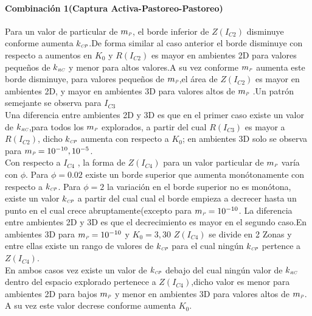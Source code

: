 \paragraph*{Combinaci\'on 1(Captura Activa-Pastoreo-Pastoreo)}Para un valor de particular de $m_{\textit{\tiny P}}$, el borde inferior de $Z(I_{C2})$ disminuye conforme aumenta $k_{\textit{\tiny CP}}$.De forma similar al caso anterior el borde disminuye con respecto a aumentos en $K_0$ y $R(I_{C2})$ es mayor en ambientes 2D para valores peque\~nos de $k_{\textit{\tiny RC}}$ y menor para altos valores.A su vez conforme $m_{\textit{\tiny P}}$ aumenta este borde disminuye, para valores peque\~nos de $m_{\textit{\tiny P}}$,el \'area de $Z(I_{C2})$ es mayor en ambientes 2D, y mayor en ambientes 3D para valores altos de $m_{\textit{\tiny P}}$ .Un patr\'on semejante se observa para $I_{C3}$ \\ Una diferencia entre ambientes 2D y 3D es que en el primer caso existe un valor de $k_{\textit{\tiny RC}}$,para todos los $m_{\textit{\tiny P}}$ explorados, a partir del cual $R(I_{C3})$ es mayor a $R(I_{C2})$, dicho $k_{\textit{\tiny CP}}$ aumenta con respecto a $K_0$; en ambientes 3D solo se observa para $m_{\textit{\tiny P}} = 10^{-10} ,10^{-5}$.\\
Con respecto a $I_{C4}$ , la forma de $Z(I_{C4})$ para un valor particular de $m_{\textit{\tiny P}}$ var\'ia con $\phi$. Para $\phi = 0.02$  existe un borde superior que aumenta mon\'otonamente con respecto a $k_{\textit{\tiny CP}}$. Para $\phi = 2$ la variaci\'on en el borde superior no es mon\'otona, existe un valor $k_{\textit{\tiny CP}}$ a partir del cual cual el borde empieza a decrecer hasta un punto en el cual crece abruptamente(excepto para $m_{\textit{\tiny P}} = 10^{-10}$. La diferencia entre ambientes 2D y 3D es que el decrecimiento es mayor en el segundo caso.En ambientes 3D para $m_{\textit{\tiny P}} = 10^{-10}$ y $K_0 = 3,30$ $Z(I_{C4})$ se divide en 2 Zonas y entre ellas existe un rango de valores de $k_{\textit{\tiny CP}}$ para el cual ning\'un $k_{\textit{\tiny CP}}$ pertence a $Z(I_{C4})$. \\
En ambos casos vez existe un valor de $k_{\textit{\tiny CP}}$ debajo del cual ning\'un valor de $k_{\textit{\tiny RC}}$ dentro del espacio explorado pertenece a $Z(I_{C4})$,dicho valor es menor para ambientes 2D para bajos $m_{\textit{\tiny P}}$ y menor en ambientes 3D para valores altos de $m_{\textit{\tiny P}}$. A su vez este valor decrese conforme aumenta $K_0$.

